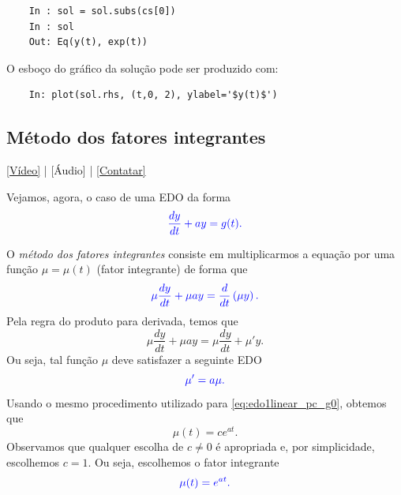 \begin{ex}
\begin{lstlisting}
    In : sol = sol.subs(cs[0])
    In : sol
    Out: Eq(y(t), exp(t))
  \end{lstlisting}
  O esboço do gráfico da solução pode ser produzido com:
  \begin{lstlisting}
    In: plot(sol.rhs, (t,0, 2), ylabel='$y(t)$')
  \end{lstlisting}
  \fi
\end{ex}

\subsection{Método dos fatores integrantes}

\begin{flushright}
  \href{https://archive.org/details/edo-ordem-1-linear-coeficientes-constantes-nao-homogenea}{[Vídeo]} | [Áudio] | \href{https://phkonzen.github.io/notas/contato.html}{[Contatar]}
\end{flushright}

Vejamos, agora, o caso de uma EDO da forma
\begin{equation}\label{eq:edo1linear_pa_g}
  \color{blue}{\frac{dy}{dt} + ay = g(t).}
\end{equation}

O \emph{método dos fatores integrantes} consiste em multiplicarmos a equação por uma função $\mu = \mu(t)$ (fator integrante) de forma que
\begin{equation}
  \color{blue}{\mu\frac{dy}{dt} + \mu ay = \frac{d}{dt}\left(\mu y\right).}
\end{equation}
Pela regra do produto para derivada, temos que
\begin{equation}
  \mu\frac{dy}{dt} + \mu ay = \mu\frac{dy}{dt} + \mu'y.
\end{equation}
Ou seja, tal função $\mu$ deve satisfazer a seguinte EDO
\begin{equation}
  \color{blue}{\mu' = a\mu.}
\end{equation}
Usando o mesmo procedimento utilizado para \eqref{eq:edo1linear_pc_g0}, obtemos que
\begin{equation}
  \mu(t) = ce^{at}.
\end{equation}
Observamos que qualquer escolha de $c\neq 0$ é apropriada e, por simplicidade, escolhemos $c=1$. Ou seja, escolhemos o fator integrante
\begin{equation}
  \color{blue}{\mu(t) = e^{at}}.
\end{equation}

